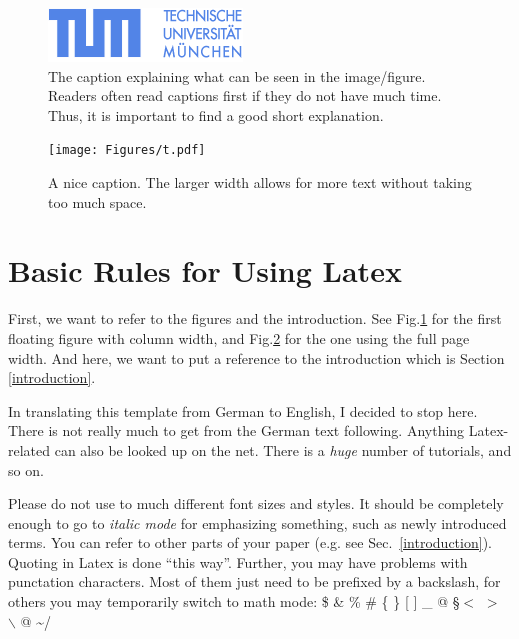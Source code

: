 \documentclass[twocolumn]{article}
\begin{document}
\begin{figure}
\centerline{
\includegraphics[width=0.9\columnwidth]{Figures/TUM-Logo-102.png}
}
\caption{The caption explaining what can be seen in the image/figure.
Readers often read captions first if they do not have much time. Thus,
it is important to find a good short explanation.}
\label{TUM}
\end{figure}

\begin{figure}
\centerline{
\texttt{[image: Figures/t.pdf]}
}
\caption{A nice caption. The larger width allows for more text without
taking too much space.}
\label{Fig2}
\end{figure}


\section{Basic Rules for Using Latex}

First, we want to refer to the figures and the introduction.
See Fig.\ref{TUM} for the first floating figure with column width,
and Fig.\ref{Fig2} for the one using the full page width.
And here, we want to put a reference to the introduction which is
Section \ref{introduction}.

In translating this template from German to English, I decided to
stop here. There is not really much to get from the German text
following. Anything Latex-related can also be looked up on the
net. There is a {\it huge} number of tutorials, and so on.

Please do not use to much different font sizes and styles. It should
be completely enough to go to {\em italic mode} for emphasizing something,
such as newly introduced terms.
You can refer to other parts of your paper (e.g. see Sec.~\ref{introduction}).
Quoting in Latex is done ``this way''.
Further, you may have problems with punctation characters.
Most of them just need to be prefixed by a backslash, for others you may
temporarily switch to math mode:
\$ \& \% \# \{ \} [ ] \_ @ \S $<$ $>$ $\backslash$ @ \textasciitilde /
\end{document}
